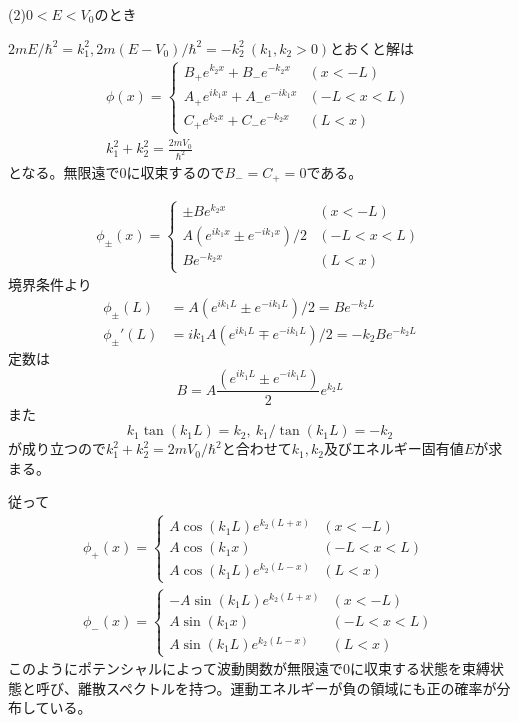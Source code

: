     (2)$0 < E < V_0$のとき

    $2mE / \hbar^2 = k_1^2, 2m(E - V_0) / \hbar^2 = - k_2^2 \ (k_1, k_2 > 0)$とおくと解は
    \begin{gather*}
        \phi(x) = 
        \begin{cases}
            B_+ e^{k_2x} + B_- e^{- k_2x} & (x < -L)\\
            A_+ e^{ik_1x} + A_- e^{- ik_1x} & (-L < x < L)\\
            C_+ e^{k_2x} + C_- e^{- k_2x} & (L < x)
        \end{cases}\\
        k_1^2 + k_2^2 = \frac{2mV_0}{\hbar^2}
    \end{gather*}
    となる。無限遠で0に収束するので$B_- = C_+ = 0$である。

    \begin{align*}
        \phi_\pm(x) =
        \begin{cases}
            \pm B e^{k_2x} & (x < -L)\\
            A (e^{ik_1x} \pm e^{-ik_1x}) / 2 & (-L < x < L)\\
            B e^{- k_2x} & (L < x)
        \end{cases}
    \end{align*}
    境界条件より
    \begin{align*}
        \phi_\pm(L) &= A (e^{ik_1L} \pm e^{-ik_1L}) / 2 = B e^{- k_2L}\\
        \phi_\pm'(L) &= ik_1 A (e^{ik_1L} \mp e^{-ik_1L}) / 2 = - k_2 B e^{- k_2L}
    \end{align*}
    定数は
        \[B = A \frac{(e^{ik_1L} \pm e^{-ik_1L})}{2} e^{k_2L}\]
    また
        \[k_1 \tan(k_1L) = k_2,\ k_1 / \tan(k_1L) = - k_2\]
    が成り立つので$k_1^2 + k_2^2 = 2mV_0 / \hbar^2$と合わせて$k_1, k_2$及びエネルギー固有値$E$が求まる。

    従って
    \begin{align*}
        \phi_+(x) =
        \begin{cases}
            A \cos(k_1L) e^{k_2(L + x)} & (x < -L)\\
            A \cos(k_1x) & (-L < x < L)\\
            A \cos(k_1L) e^{k_2(L - x)} & (L < x)
        \end{cases}\\
        \phi_-(x) =
        \begin{cases}
            - A \sin(k_1L) e^{k_2(L + x)} & (x < -L)\\
            A \sin(k_1x) & (-L < x < L)\\
            A \sin(k_1L) e^{k_2(L - x)} & (L < x)
        \end{cases}
    \end{align*}
    このようにポテンシャルによって波動関数が無限遠で0に収束する状態を束縛状態と呼び、離散スペクトルを持つ。運動エネルギーが負の領域にも正の確率が分布している。

